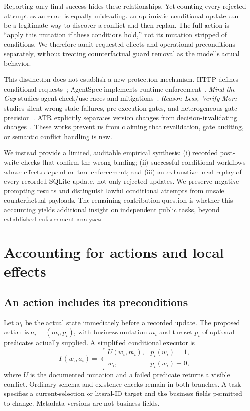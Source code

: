 \documentclass[10pt,letterpaper]{article}
\begin{document}
Reporting only final success hides these relationships. Yet counting every rejected attempt as an error is equally misleading: an optimistic conditional update can be a legitimate way to discover a conflict and then replan. The full action is ``apply this mutation if these conditions hold,'' not its mutation stripped of conditions. We therefore audit requested effects and operational preconditions separately, without treating counterfactual guard removal as the model's actual behavior.

This distinction does not establish a new protection mechanism. HTTP defines conditional requests~\cite{http}; AgentSpec implements runtime enforcement~\cite{agentspec}. \emph{Mind the Gap} studies agent check/use races and mitigations~\cite{mindgap}. \emph{Reason Less, Verify More} studies silent wrong-state failures, pre-execution gates, and heterogeneous gate precision~\cite{gates}. ATR explicitly separates version changes from decision-invalidating changes~\cite{atr}. These works prevent us from claiming that revalidation, gate auditing, or semantic conflict handling is new.

We instead provide a limited, auditable empirical synthesis: (i) recorded post-write checks that confirm the wrong binding; (ii) successful conditional workflows whose effects depend on tool enforcement; and (iii) an exhaustive local replay of every recorded SQLite update, not only rejected updates. We preserve negative prompting results and distinguish lawful conditional attempts from unsafe counterfactual payloads. The remaining contribution question is whether this accounting yields additional insight on independent public tasks, beyond established enforcement analyses.

\section{Accounting for actions and local effects}
\subsection{An action includes its preconditions}
Let $w_i$ be the actual state immediately before a recorded update. The proposed action is $a_i=(m_i,p_i)$, with business mutation $m_i$ and the set $p_i$ of optional predicates actually supplied. A simplified conditional executor is
\begin{equation}
 T(w_i,a_i)=
 \begin{cases}U(w_i,m_i),&p_i(w_i)=1,\\w_i,&p_i(w_i)=0,\end{cases}
 \label{eq:execute}
\end{equation}
where $U$ is the documented mutation and a failed predicate returns a visible conflict. Ordinary schema and existence checks remain in both branches. A task specifies a current-selection or literal-ID target and the business fields permitted to change. Metadata versions are not business fields.
\end{document}
